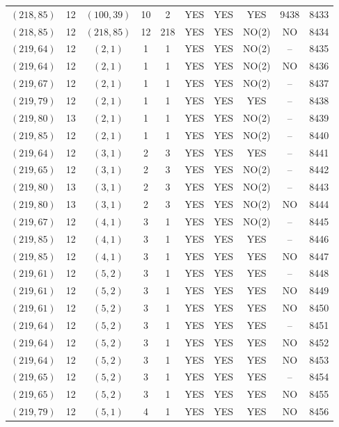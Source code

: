 \begin{longtable}{|c|c|c|c|c|c|c|c|c|c|}
$(218, 85)$ & 12 & $(100, 39)$ & 10 & 2 & YES & YES & YES & 9438 & 8433\\
$(218, 85)$ & 12 & $(218, 85)$ & 12 & 218 & YES & YES & NO(2) & NO & 8434\\
$(219, 64)$ & 12 & $(2, 1)$ & 1 & 1 & YES & YES & NO(2) & -- & 8435\\
$(219, 64)$ & 12 & $(2, 1)$ & 1 & 1 & YES & YES & NO(2) & NO & 8436\\
$(219, 67)$ & 12 & $(2, 1)$ & 1 & 1 & YES & YES & NO(2) & -- & 8437\\
$(219, 79)$ & 12 & $(2, 1)$ & 1 & 1 & YES & YES & YES & -- & 8438\\
$(219, 80)$ & 13 & $(2, 1)$ & 1 & 1 & YES & YES & NO(2) & -- & 8439\\
$(219, 85)$ & 12 & $(2, 1)$ & 1 & 1 & YES & YES & NO(2) & -- & 8440\\
$(219, 64)$ & 12 & $(3, 1)$ & 2 & 3 & YES & YES & YES & -- & 8441\\
$(219, 65)$ & 12 & $(3, 1)$ & 2 & 3 & YES & YES & NO(2) & -- & 8442\\
$(219, 80)$ & 13 & $(3, 1)$ & 2 & 3 & YES & YES & NO(2) & -- & 8443\\
$(219, 80)$ & 13 & $(3, 1)$ & 2 & 3 & YES & YES & NO(2) & NO & 8444\\
$(219, 67)$ & 12 & $(4, 1)$ & 3 & 1 & YES & YES & NO(2) & -- & 8445\\
$(219, 85)$ & 12 & $(4, 1)$ & 3 & 1 & YES & YES & YES & -- & 8446\\
$(219, 85)$ & 12 & $(4, 1)$ & 3 & 1 & YES & YES & YES & NO & 8447\\
$(219, 61)$ & 12 & $(5, 2)$ & 3 & 1 & YES & YES & YES & -- & 8448\\
$(219, 61)$ & 12 & $(5, 2)$ & 3 & 1 & YES & YES & YES & NO & 8449\\
$(219, 61)$ & 12 & $(5, 2)$ & 3 & 1 & YES & YES & YES & NO & 8450\\
$(219, 64)$ & 12 & $(5, 2)$ & 3 & 1 & YES & YES & YES & -- & 8451\\
$(219, 64)$ & 12 & $(5, 2)$ & 3 & 1 & YES & YES & YES & NO & 8452\\
$(219, 64)$ & 12 & $(5, 2)$ & 3 & 1 & YES & YES & YES & NO & 8453\\
$(219, 65)$ & 12 & $(5, 2)$ & 3 & 1 & YES & YES & YES & -- & 8454\\
$(219, 65)$ & 12 & $(5, 2)$ & 3 & 1 & YES & YES & YES & NO & 8455\\
$(219, 79)$ & 12 & $(5, 1)$ & 4 & 1 & YES & YES & YES & NO & 8456\\

\end{longtable}
